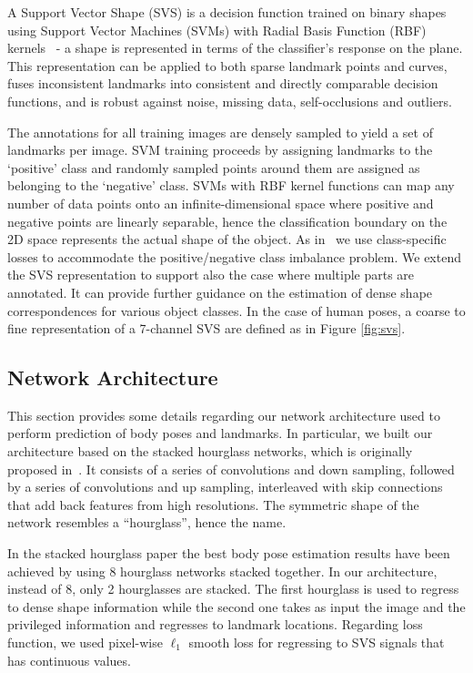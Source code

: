 A Support Vector Shape (SVS) is a decision function trained on binary shapes using Support Vector Machines (SVMs) with Radial Basis Function (RBF) kernels~\cite{Nguyen2013} - a shape is represented in terms of the classifier's response on the plane. This representation can be applied to both sparse landmark points and curves,  fuses inconsistent landmarks into consistent and directly comparable decision functions, and is  robust against noise, missing data, self-occlusions and outliers.

The annotations for all training images are densely sampled to yield a set of landmarks per image.  SVM training proceeds by assigning landmarks  to the `positive' class and randomly sampled points around them are assigned as belonging to the `negative' class. SVMs with RBF kernel functions can map any number of data points onto an infinite-dimensional space where positive and negative points are linearly separable, hence the classification boundary on the 2D space represents the actual shape of the object. As in~\cite{Nguyen2013} we use class-specific losses to accommodate the positive/negative class imbalance problem. 
We extend the SVS representation to support also the case where multiple parts are annotated. It can provide further guidance on the estimation of dense shape correspondences for various object classes. In the case of human poses, a coarse to fine representation of a 7-channel SVS are defined as in Figure \ref{fig:svs}. 

\subsection{Network Architecture}

This section provides some details regarding our network architecture used to perform prediction of body poses and landmarks. In particular, we built our architecture based on the stacked hourglass networks, which is originally proposed in~\cite{newell2016stacked}. It consists of a series of convolutions and down sampling, followed by a series of convolutions and up sampling, interleaved with skip connections that add back features from high resolutions. The symmetric shape of the network resembles a “hourglass”, hence the name.

In the stacked hourglass paper the best body pose estimation results have been achieved by using 8 hourglass networks stacked together. In our architecture, instead of 8, only 2 hourglasses are stacked. The first hourglass is used to regress to dense shape information while the second one takes as input the image and the privileged information and regresses to landmark locations. Regarding loss function, we used pixel-wise $\ell_1$ smooth loss for regressing to SVS signals that has continuous values.


